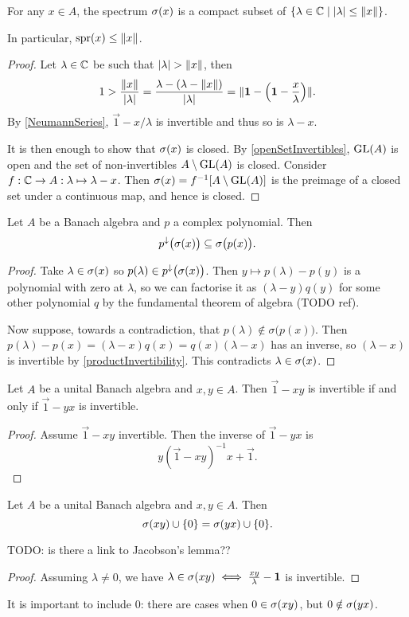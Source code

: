 \begin{proposition} \label{spectrumCompact}
For any $x\in A$, the spectrum $\sigma(x)$ is a compact subset of $\setbuilder{\lambda\in\C}{|\lambda|\leq \norm{x}}$.

In particular, $\operatorname{spr}(x) \leq \lVert x\rVert$.
\end{proposition}
\begin{proof}
Let $\lambda\in \mathbb{C}$ be such that $|\lambda|>\norm{x}$, then
\[ 1 > \frac{\lVert x\rVert}{|\lambda|} = \frac{\lambda - (\lambda - \lVert x\rVert)}{|\lambda|} = \lVert\boldsymbol{\mathrm{1}} - \left(\boldsymbol{\mathrm{1}} - \frac{x}{\lambda}\right)\rVert. \]
By \ref{NeumannSeries}, $\vec{1} - x/\lambda$ is invertible and thus so is $\lambda-x$.

It is then enough to show that $\sigma(x)$ is closed. By \ref{openSetInvertibles}, $\operatorname{GL}(A)$ is open and the set of non-invertibles $A\setminus \operatorname{GL}(A)$ is closed. Consider $f: \mathbb{C} \to A: \lambda \mapsto \lambda - x$. Then $\sigma(x) = f^{-1}[A\setminus \operatorname{GL}(A)]$ is the preimage of a closed set under a continuous map, and hence is closed.
\end{proof}

\begin{lemma} \label{polynomialSpectralMapping}
Let $A$ be a Banach algebra and $p$ a complex polynomial. Then
\[ p^{\downarrow}\big(\sigma(x)\big) \subseteq \sigma\big(p(x)\big). \]
\end{lemma}
\begin{proof}
Take $\lambda\in\sigma(x)$ so $p(\lambda)\in p^{\downarrow}\big(\sigma(x)\big)$. Then $y\mapsto p(\lambda)-p(y)$ is a polynomial with zero at $\lambda$, so we can factorise it as $(\lambda - y)q(y)$ for some other polynomial $q$ by the fundamental theorem of algebra (TODO ref).

Now suppose, towards a contradiction, that $p(\lambda)\notin \sigma\big(p(x)\big)$. Then $p(\lambda) - p(x) = (\lambda - x)q(x) = q(x)(\lambda - x)$ has an inverse, so $(\lambda - x)$ is invertible by \ref{productInvertibility}. This contradicts $\lambda\in\sigma(x)$.
\end{proof}

\begin{proposition}
Let $A$ be a unital Banach algebra and $x,y\in A$. Then $\vec{1} - xy$ is invertible \textup{if and only if} $\vec{1} - yx$ is invertible.
\end{proposition}
\begin{proof}
Assume $\vec{1} - xy$ invertible. Then the inverse of $\vec{1} - yx$ is
\[ y(\vec{1} - xy)^{-1}x + \vec{1}. \]
\end{proof}
\begin{corollary}
Let $A$ be a unital Banach algebra and $x,y\in A$. Then
\[ \sigma(xy)\cup\{0\} = \sigma(yx)\cup\{0\}. \]
\end{corollary}
TODO: is there a link to Jacobson's lemma??
\begin{proof}
Assuming $\lambda \neq 0$, we have $\lambda\in\sigma(xy) \iff \frac{xy}{\lambda} - \boldsymbol{\mathrm{1}}$ is invertible.
\end{proof}
It is important to include $0$: there are cases when $0\in \sigma(xy)$, but $0\notin \sigma(yx)$.

